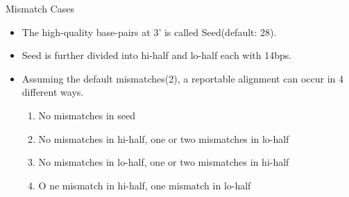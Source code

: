 \documentclass[mathserif]{beamer}
\begin{document}
\begin{frame}{Mismatch Cases}
\begin{itemize}
    \item The high-quality base-pairs at 3' is called Seed(default: 28). 
    \item Seed is further divided into hi-half and lo-half each with 14bps.
    \item  Assuming the default mismatches(2), a reportable alignment can occur in 
    4 different ways. 
    \begin{enumerate}
        \item No mismatches in seed
        \item No mismatches in hi-half, one or two mismatches in lo-half
        \item No mismatches in lo-half, one or two mismatches in hi-half
        \item O ne mismatch in hi-half, one mismatch in lo-half
    \end{enumerate} 
\end{itemize}
\end{frame}
\end{document}
